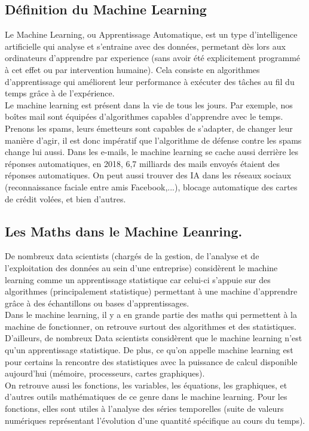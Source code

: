 \documentclass[a4paper, 12pt]{article}
\numberwithin{equation}{subsection}
\begin{document}
\subsection{Définition du Machine Learning}
Le Machine Learning, ou Apprentissage Automatique, est un type d'intelligence artificielle qui analyse et s'entraine avec des données, permetant dès lors aux ordinateurs d'apprendre par experience (sans avoir été explicitement programmé à cet effet ou par intervention humaine). Cela consiste en algorithmes d’apprentissage qui améliorent leur performance à exécuter des tâches au fil du temps grâce à de l’expérience.\\Le machine learning est présent dans la vie de tous les jours. Par exemple, nos boîtes mail sont équipées d'algorithmes capables d’apprendre avec le temps. Prenons les spams, leurs émetteurs sont capables de s'adapter, de changer leur manière d’agir, il est donc impératif que l’algorithme de défense contre les spams change lui aussi. Dans les e-mails, le machine learning se cache aussi derrière les réponses automatiques, en 2018, 6,7 milliards des mails envoyés étaient des réponses automatiques. On peut aussi trouver des IA dans les réseaux sociaux (reconnaissance faciale entre amis Facebook,...), blocage automatique des cartes de crédit volées, et bien d'autres.\\[1.0cm]
\subsection{Les Maths dans le Machine Leanring.}
De nombreux data scientists (chargés de la gestion, de l’analyse et de l’exploitation des données au sein d’une entreprise) considèrent le machine learning comme un apprentissage statistique car celui-ci s’appuie sur des algorithmes (principalement statistique) permettant à une machine d'apprendre grâce à des échantillons ou bases d’apprentissages.\\Dans le machine learning, il y a en grande partie des maths qui permettent à la machine de fonctionner, on retrouve surtout des algorithmes et des statistiques. D’ailleurs, de nombreux Data scientists considèrent que le machine learning n’est qu’un apprentissage statistique. De plus, ce qu’on appelle machine learning est pour certains la rencontre des statistiques avec la puissance de calcul disponible aujourd’hui (mémoire, processeurs, cartes graphiques).\\On retrouve aussi les fonctions, les variables, les équations, les graphiques, et d’autres outils mathématiques de ce genre dans le machine learning.  Pour les fonctions, elles sont utiles à l’analyse des séries temporelles (suite de valeurs numériques représentant l’évolution d’une quantité spécifique au cours du temps).\\[1.0cm]
\end{document}
